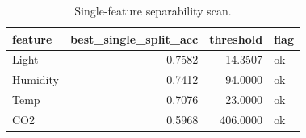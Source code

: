 \begin{table}
\caption{Single-feature separability scan.}
\label{tab:leak}
\begin{tabular}{lrrl}
\toprule
feature & best\_single\_split\_acc & threshold & flag \\
\midrule
Light & 0.7582 & 14.3507 & ok \\
Humidity & 0.7412 & 94.0000 & ok \\
Temp & 0.7076 & 23.0000 & ok \\
CO2 & 0.5968 & 406.0000 & ok \\
\bottomrule
\end{tabular}
\end{table}
